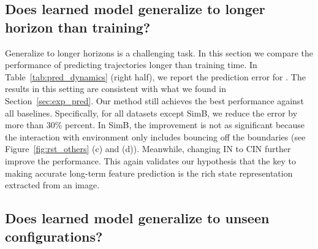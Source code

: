 \documentclass{article} \usepackage{iclr2021_conference,times}
\begin{document}
\subsection{Does learned model generalize to longer horizon than training?}
\vspace{-0.5em}
Generalize to longer horizons is a challenging task. In this section we compare the performance of predicting trajectories longer than training time. In Table~\ref{tab:pred_dynamics} (right half), we report the prediction error for . The results in this setting are consistent with what we found in Section~\ref{sec:exp_pred}. Our method still achieves the best performance against all baselines. Specifically, for all datasets except SimB, we reduce the error by more than 30\% percent. In SimB, the improvement is not as significant because the interaction with environment only includes bouncing off the boundaries (see Figure~\ref{fig:rst_others} (c) and (d)). Meanwhile, changing IN to CIN further improve the performance. This again validates our hypothesis that the key to making accurate long-term feature prediction is the rich state representation extracted from an image.

\vspace{-0.5em}
\subsection{Does learned model generalize to unseen configurations?}
\vspace{-0.5em}

\begin{table}[t]
\centering
\setlength{\tabcolsep}{3pt}
\renewcommand{\arraystretch}{1.37}
\caption{The ability to generalize to novel environments. We show the average prediction error for . Our method achieves significantly better results compared to previous methods. The error is scaled by 1,000. Our method generalizes much better than other baselines.}
\label{tab:generalization}
\vspace{-1.0em}
\end{table}
\end{document}

